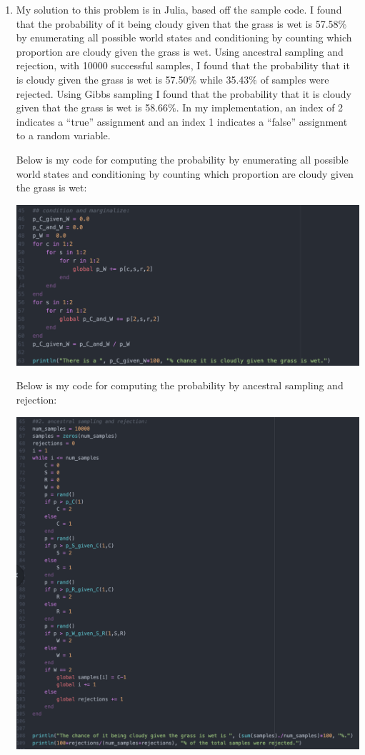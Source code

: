 \documentclass[11pt]{article}
\theoremstyle{definition}
\begin{document}
\begin{enumerate}
\item My solution to this problem is in Julia, based off the sample code. I found that the probability of it being cloudy given that the grass is wet is 57.58$\%$ by enumerating all possible world states and conditioning by counting which proportion are cloudy given the grass is wet. Using ancestral sampling and rejection, with 10000 successful samples, I found that the probability that it is cloudy given the grass is wet is 57.50$\%$ while 35.43$\%$ of samples were rejected. Using Gibbs sampling I found that the probability that it is cloudy given that the grass is wet is 58.66$\%$. In my implementation, an index of 2 indicates a ``true'' assignment and an index 1 indicates a ``false'' assignment to a random variable.

Below is my code for computing the probability by enumerating all possible world states and conditioning by counting which proportion are cloudy given the grass is wet:

\begin{center}
\includegraphics[scale=0.4]{figures/q3_1}
\end{center}

Below is my code for computing the probability by ancestral sampling and rejection:

\begin{center}
\includegraphics[scale=0.6]{figures/q3_2}
\end{center}


\end{enumerate}
\end{document}
